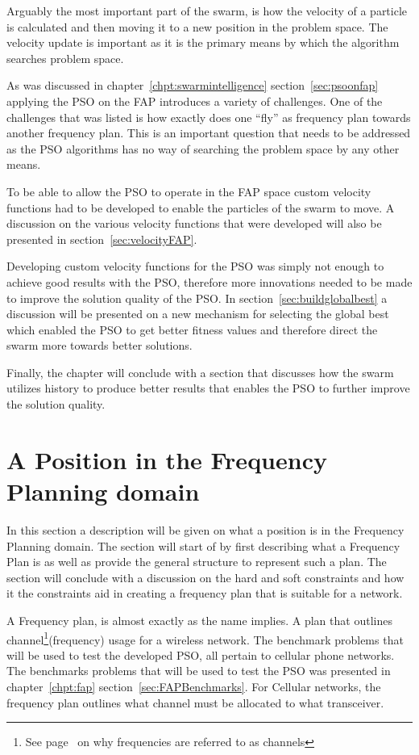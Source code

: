 Arguably the most important part of the swarm, is how the velocity of a particle is calculated and then moving it to a new position in the problem space. The velocity update is important as it is the primary means by which the algorithm searches problem space.

As was discussed in chapter~\ref{chpt:swarmintelligence} section~\ref{sec:psoonfap} applying the PSO on the FAP introduces a variety of challenges. One of the challenges that was listed is how exactly does one ``fly'' as frequency plan towards another frequency plan. This is an important question that needs to be addressed as the PSO algorithms has no way of searching the problem space by any other means.

To be able to allow the PSO to operate in the FAP space custom velocity functions had to be developed to enable the particles of the swarm to move. A discussion on the various velocity functions that were developed will also be presented in section~\ref{sec:velocityFAP}. 

Developing custom velocity functions for the PSO was simply not enough to achieve good results with the PSO, therefore more innovations needed to be made to improve the solution quality of the PSO. In section~\ref{sec:buildglobalbest} a discussion will be presented on a new mechanism for selecting the global best which enabled the PSO to get better fitness values and therefore direct the swarm more towards better solutions. 

Finally, the chapter will conclude with a section that discusses how the swarm utilizes history to produce better results that enables the PSO to further improve the solution quality.
\section{A Position in the Frequency Planning domain}
In this section a description will be given on what a position is in the Frequency Planning domain. The section will start of by first describing what a Frequency Plan is as well as provide the general structure to represent such a plan. The section will conclude with a discussion on the hard and soft constraints and how it the constraints aid in creating a frequency plan that is suitable for a network.

A Frequency plan, is almost exactly as the name implies. A plan that outlines channel\footnote{See page~\pageref{def:channel} on why frequencies are referred to as channels}(frequency) usage for a wireless network. The benchmark problems that will be used to test the developed PSO, all pertain to cellular phone networks. The benchmarks problems that will be used to test the PSO was presented in chapter~\ref{chpt:fap} section~\ref{sec:FAPBenchmarks}. For Cellular networks, the frequency plan outlines what channel must be allocated to what transceiver.

